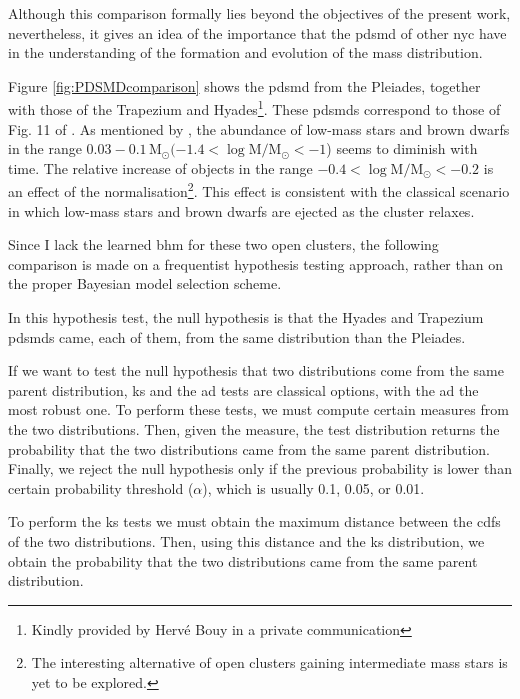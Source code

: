 Although this comparison formally lies beyond the objectives of the present work, nevertheless, it gives an idea of the importance that the \gls{pdsmd} of other \gls{nyc} have in the understanding of the formation and evolution of the mass distribution.

Figure \ref{fig:PDSMDcomparison} shows the \gls{pdsmd} from the Pleiades, together with those of the Trapezium and Hyades\footnote{Kindly provided by Herv\'e Bouy in a private communication}. These \glspl{pdsmd} correspond to those of  Fig. 11 of \citet{Bouy2015}. As mentioned by \citet{Bouy2015}, the abundance of low-mass stars and brown dwarfs in the range $0.03 - 0.1\,\mathrm{M_{\odot}}(-1.4 < \log \mathrm{M/M_{\odot}} <-1$) seems to diminish with time. The relative increase of objects in the range $-0.4 < \mathrm{\log M/M_{\odot}} < -0.2$ is an effect of the normalisation\footnote{The interesting alternative of open clusters gaining intermediate mass stars is yet to be explored.}. This effect is consistent with the classical scenario in which low-mass stars and brown dwarfs are ejected as the cluster relaxes.

Since I lack the learned \gls{bhm} for these two open clusters, the following comparison is made on a frequentist hypothesis testing approach, rather than on the proper Bayesian model selection scheme.

In this hypothesis test, the null hypothesis is that the Hyades and Trapezium \glspl{pdsmd} came, each of them, from the same distribution than the Pleiades. 

If we want to test the null hypothesis that two distributions come from the same parent distribution, \gls{ks} and the \gls{ad} tests are classical options, with the \gls{ad} the most robust one. To perform these tests, we must compute certain measures from the two distributions. Then, given the measure, the test distribution returns the probability that the two distributions came from the same parent distribution. Finally, we reject the null hypothesis only if the previous probability is lower than certain probability threshold ($\alpha$), which is usually 0.1, 0.05, or 0.01. 

To perform the \gls{ks} tests we must obtain the maximum distance between the \glspl{cdf} of the two distributions. Then, using this distance and the \gls{ks} distribution, we obtain the probability that the two distributions came from the same parent distribution. %

